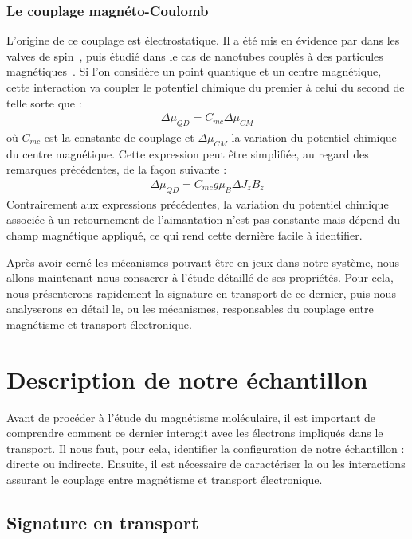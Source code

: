 \subsubsection{Le couplage magnéto-Coulomb}
L'origine de ce couplage est électrostatique. Il a été mis en évidence par dans les valves de spin~\cite{Molen2006}, puis étudié dans le cas de nanotubes couplés à des particules magnétiques~\cite{Datta2011}. Si l'on considère un point quantique et un centre magnétique, cette interaction va coupler le potentiel chimique du premier à celui du second de telle sorte que :
\begin{eqnarray}
\Delta \mu_{QD} = C_{mc} \Delta \mu_{CM}
\end{eqnarray}
où $C_{mc}$ est la constante de couplage et $\Delta \mu_{CM}$ la variation du potentiel chimique du centre magnétique. Cette expression peut être simplifiée, au regard des remarques précédentes, de la façon suivante :
\begin{eqnarray}
\Delta \mu_{QD} = C_{mc} g \mu_B  \Delta J_z B_z
\end{eqnarray}
Contrairement aux expressions précédentes, la variation du potentiel chimique associée à un retournement de l'aimantation n'est pas constante mais dépend du champ magnétique appliqué, ce qui rend cette dernière facile à identifier.


Après avoir cerné les mécanismes pouvant être en jeux dans notre système, nous allons maintenant nous consacrer à l'étude détaillé de ses propriétés. Pour cela, nous présenterons rapidement la signature en transport de ce dernier, puis nous analyserons en détail le, ou les mécanismes, responsables du couplage entre magnétisme et transport électronique.

\section{Description de notre échantillon}
Avant de procéder à l'étude du magnétisme moléculaire, il est important de comprendre comment ce dernier interagit avec les électrons impliqués dans le transport. Il nous faut, pour cela, identifier la configuration de notre échantillon : directe ou indirecte. Ensuite, il est nécessaire de caractériser la ou les interactions assurant le couplage entre magnétisme et transport électronique.


\subsection{Signature en transport}

